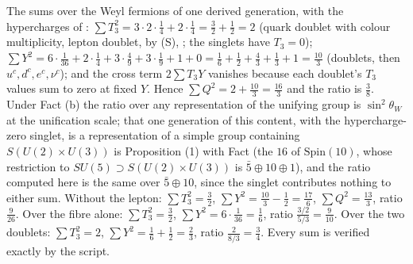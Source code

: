 The sums over the Weyl fermions of one derived generation, with the hypercharges of : $\sum T_{3}^{2} = 3 \cdot 2 \cdot \tfrac14 + 2 \cdot \tfrac14 = \tfrac32 + \tfrac12 = 2$ (quark doublet with colour multiplicity, lepton doublet, by (S), ; the singlets have $T_{3} = 0$); $\sum Y^{2} = 6 \cdot \tfrac{1}{36} + 2 \cdot \tfrac14 + 3 \cdot \tfrac49 + 3 \cdot \tfrac19 + 1 + 0 = \tfrac16 + \tfrac12 + \tfrac43 + \tfrac13 + 1 = \tfrac{10}{3}$ (doublets, then $u^{c}, d^{c}, e^{c}, \nu^{c}$); and the cross term $2\sum T_{3}Y$ vanishes because each doublet's $T_{3}$ values sum to zero at fixed $Y$. Hence $\sum Q^{2} = 2 + \tfrac{10}{3} = \tfrac{16}{3}$ and the ratio is $\tfrac38$. Under Fact (b) the ratio over any representation of the unifying group is $\sin^{2}\theta_{W}$ at the unification scale; that one generation of this content, with the hypercharge-zero singlet, is a representation of a simple group containing $S(U(2) \times U(3))$ is Proposition (1) with Fact  (the $16$ of $\mathrm{Spin}(10)$, whose restriction to $SU(5) \supset S(U(2) \times U(3))$ is $\bar{5} \oplus 10 \oplus 1$), and the ratio computed here is the same over $\bar{5} \oplus 10$, since the singlet contributes nothing to either sum. Without the lepton: $\sum T_{3}^{2} = \tfrac32$, $\sum Y^{2} = \tfrac{10}{3} - \tfrac12 = \tfrac{17}{6}$, $\sum Q^{2} = \tfrac{13}{3}$, ratio $\tfrac{9}{26}$. Over the fibre alone: $\sum T_{3}^{2} = \tfrac32$, $\sum Y^{2} = 6 \cdot \tfrac{1}{36} = \tfrac16$, ratio $\tfrac{3/2}{5/3} = \tfrac{9}{10}$. Over the two doublets: $\sum T_{3}^{2} = 2$, $\sum Y^{2} = \tfrac16 + \tfrac12 = \tfrac23$, ratio $\tfrac{2}{8/3} = \tfrac34$. Every sum is verified exactly by the script.
